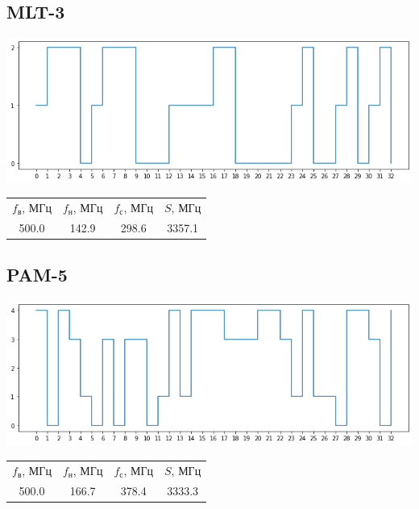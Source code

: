 \subsection{MLT-3}
\includegraphics[width=\textwidth]{2mlt3}
\begin{center}
    \begin{tabular}{cccc}
        $f_\mathrm{\text{в}}$, МГц & $f_\mathrm{\text{н}}$, МГц & $f_\mathrm{\text{с}}$, МГц & $S$, МГц \\
        500.0 & 142.9 & 298.6 & 3357.1 \\
    \end{tabular}
\end{center}

\subsection{PAM-5}
\includegraphics[width=\textwidth]{2pam5}
\begin{center}
    \begin{tabular}{cccc}
        $f_\mathrm{\text{в}}$, МГц & $f_\mathrm{\text{н}}$, МГц & $f_\mathrm{\text{с}}$, МГц & $S$, МГц \\
        500.0 & 166.7 & 378.4 & 3333.3 \\
    \end{tabular}
\end{center}

